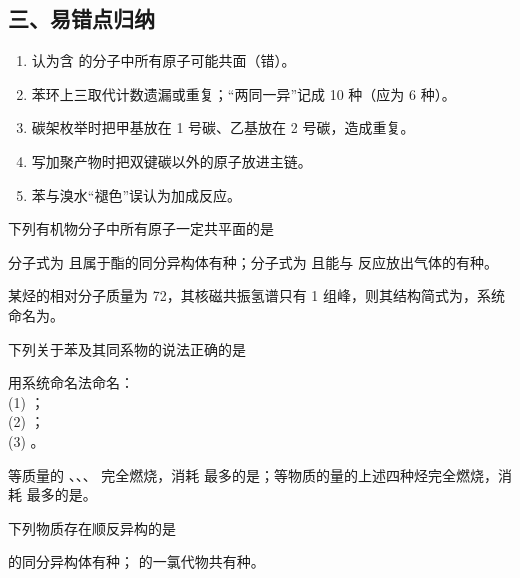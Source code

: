 \subsection*{三、易错点归纳}
\begin{enumerate}
\item 认为含  的分子中所有原子可能共面（错）。
\item 苯环上三取代计数遗漏或重复；“两同一异”记成 10 种（应为 6 种）。
\item 碳架枚举时把甲基放在 1 号碳、乙基放在 2 号碳，造成重复。
\item 写加聚产物时把双键碳以外的原子放进主链。
\item 苯与溴水“褪色”误认为加成反应。
\end{enumerate}

\begin{xiti}[start=1]
\item 下列有机物分子中所有原子一定共平面的是\xz
{}

\item 分子式为  且属于酯的同分异构体有\tk{}种；分子式为  且能与  反应放出气体的有\tk{}种。

\item 某烃的相对分子质量为 72，其核磁共振氢谱只有 1 组峰，则其结构简式为\tk，系统命名为\tk。

\item 下列关于苯及其同系物的说法正确的是\xz
{}

\item 用系统命名法命名：\\(1) \tk[6em]；\\(2) \tk[6em]；\\(3) \tk[6em]。

\item 等质量的 、、、 完全燃烧，消耗  最多的是\tk；等物质的量的上述四种烃完全燃烧，消耗  最多的是\tk。

\item 下列物质存在顺反异构的是\xz
{}

\item {} 的同分异构体有\tk{}种； 的一氯代物共有\tk{}种。
\end{xiti}

